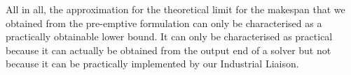 \vspace{\baselineskip}
\noindent
All in all, the approximation for the theoretical limit for the makespan that we obtained from the pre-emptive formulation can only be characterised as a practically obtainable lower bound. It can only be characterised as practical because it can actually be obtained from the output end of a solver but not because it can be practically implemented by our Industrial Liaison. 



